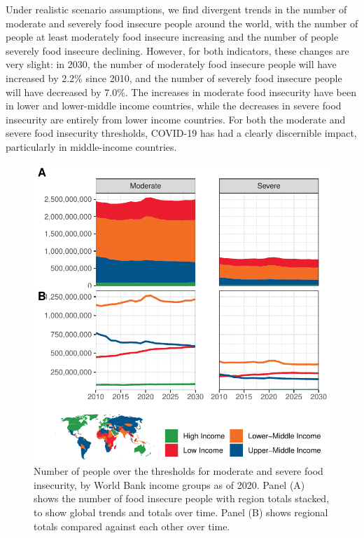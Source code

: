 \documentclass{article}
\begin{document}
Under realistic scenario assumptions, we find divergent trends in the number of moderate and severely food insecure people around the world, with the number of people at least moderately food insecure increasing and the number of people severely food insecure declining.  However, for both indicators, these changes are very slight: in 2030, the number of moderately food insecure people will have increased by 2.2\% since 2010, and the number of severely food insecure people will have decreased by 7.0\%.  The increases in moderate food insecurity have been in lower and lower-middle income countries, while the decreases in severe food insecurity are entirely from lower income countries.  For both the moderate and severe food insecurity thresholds, COVID-19 has had a clearly discernible impact, particularly in middle-income countries.

\begin{figure}[H]
  \centering
  \includegraphics[width=\linewidth]{img/TimeSeries.pdf}
  \caption{Number of people over the thresholds for moderate and severe food insecurity, by World Bank income groups as of 2020.  Panel (A) shows the number of food insecure people with region totals stacked, to show global trends and totals over time.  Panel (B) shows regional totals compared against each other over time.}
  \label{fig:timeseries}
\end{figure}
\end{document}
